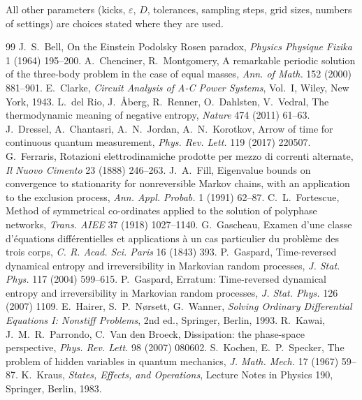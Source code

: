 \documentclass[11pt]{article}
\theoremstyle{definition}\newtheorem{definition}[theorem]{Definition}
\theoremstyle{remark}\newtheorem{remark}[theorem]{Remark}
\begin{document}
All other parameters (kicks, $\varepsilon$, $D$, tolerances, sampling steps, grid sizes, numbers of settings) are choices stated where they are used.


\begin{thebibliography}{99}\small\setlength{\itemsep}{1pt}\setlength{\parskip}{0pt}
 J.~S.~Bell, On the Einstein Podolsky Rosen paradox, \emph{Physics Physique Fizika} 1 (1964) 195--200.
 A.~Chenciner, R.~Montgomery, A remarkable periodic solution of the three-body problem in the case of equal masses, \emph{Ann. of Math.} 152 (2000) 881--901.
 E.~Clarke, \emph{Circuit Analysis of A-C Power Systems}, Vol.~I, Wiley, New York, 1943.
 L.~del Rio, J.~\AA berg, R.~Renner, O.~Dahlsten, V.~Vedral, The thermodynamic meaning of negative entropy, \emph{Nature} 474 (2011) 61--63.
 J.~Dressel, A.~Chantasri, A.~N.~Jordan, A.~N.~Korotkov, Arrow of time for continuous quantum measurement, \emph{Phys. Rev. Lett.} 119 (2017) 220507.
 G.~Ferraris, Rotazioni elettrodinamiche prodotte per mezzo di correnti alternate, \emph{Il Nuovo Cimento} 23 (1888) 246--263.
 J.~A.~Fill, Eigenvalue bounds on convergence to stationarity for nonreversible Markov chains, with an application to the exclusion process, \emph{Ann. Appl. Probab.} 1 (1991) 62--87.
 C.~L.~Fortescue, Method of symmetrical co-ordinates applied to the solution of polyphase networks, \emph{Trans. AIEE} 37 (1918) 1027--1140.
 G.~Gascheau, Examen d'une classe d'\'equations diff\'erentielles et applications \`a un cas particulier du probl\`eme des trois corps, \emph{C. R. Acad. Sci. Paris} 16 (1843) 393.
 P.~Gaspard, Time-reversed dynamical entropy and irreversibility in Markovian random processes, \emph{J. Stat. Phys.} 117 (2004) 599--615.
 P.~Gaspard, Erratum: Time-reversed dynamical entropy and irreversibility in Markovian random processes, \emph{J. Stat. Phys.} 126 (2007) 1109.
 E.~Hairer, S.~P.~N{\o}rsett, G.~Wanner, \emph{Solving Ordinary Differential Equations I: Nonstiff Problems}, 2nd ed., Springer, Berlin, 1993.
 R.~Kawai, J.~M.~R.~Parrondo, C.~Van den Broeck, Dissipation: the phase-space perspective, \emph{Phys. Rev. Lett.} 98 (2007) 080602.
 S.~Kochen, E.~P.~Specker, The problem of hidden variables in quantum mechanics, \emph{J. Math. Mech.} 17 (1967) 59--87.
 K.~Kraus, \emph{States, Effects, and Operations}, Lecture Notes in Physics 190, Springer, Berlin, 1983.

\end{thebibliography}
\end{document}
